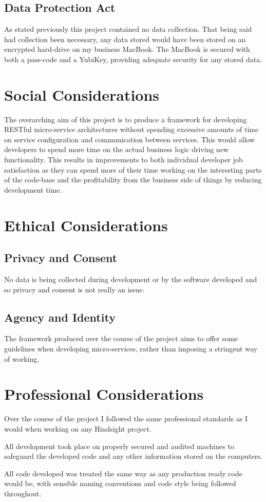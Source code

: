 \subsection{Data Protection Act}
As stated previously this project contained no data collection. That being said had collection been necessary, any data stored would have been stored on an encrypted hard-drive on my business MacBook. The MacBook is secured with both a pass-code and a YubiKey, providing adequate security for any stored data.
\section{Social Considerations}
The overarching aim of this project is to produce a framework for developing RESTful micro-service architectures without spending excessive amounts of time on service configuration and communication between services. This would allow developers to spend more time on the actual business logic driving new functionality. This results in improvements to both individual developer job satisfaction as they can spend more of their time working on the interesting parts of the code-base and the profitability from the business side of things by reducing development time.
\section{Ethical Considerations}
\subsection{Privacy and Consent}
No data is being collected during development or by the software developed and so privacy and consent is not really an issue.
\subsection{Agency and Identity}
The framework produced over the course of the project aims to offer some guidelines when developing micro-services, rather than imposing a stringent way of working.
\section{Professional Considerations}
Over the course of the project I followed the same professional standards as I would when working on any Hindsight project.

All development took place on properly secured and audited machines to safeguard the developed code and any other information stored on the computers.

All code developed was treated the same way as any production ready code would be, with sensible naming conventions and code style being followed throughout. 